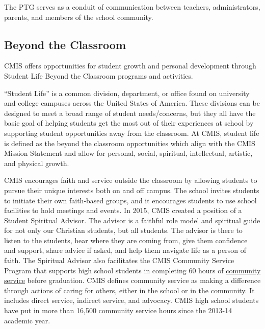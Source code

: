 The PTG serves as a conduit of communication between teachers, administrators, parents, and members of the school community.  


\subsection{Beyond the Classroom}

CMIS offers opportunities for student growth and personal development through Student Life Beyond the Classroom programs and activities.  


“Student Life” is a common division, department, or office found on university and college campuses across the United States of America.  These divisions can be designed to meet a broad range of student needs/concerns, but they all have the basic goal of helping students get the most out of their experiences at school by supporting student opportunities away from the classroom.  At CMIS, student life is defined as the beyond the classroom opportunities which align with the CMIS Mission Statement and allow for personal, social, spiritual, intellectual, artistic, and physical growth.


CMIS encourages faith and service outside the classroom by allowing students to pursue their unique interests both on and off campus. The school invites students to initiate their own faith-based groups, and it encourages students to use school facilities to hold meetings and events.  In 2015, CMIS created a position of  a Student Spiritual Advisor.  The advisor is a faithful role model and spiritual guide for not only our Christian students, but all students. The advisor is there to listen to the students, hear where they are coming from, give them confidence and support, share advice if asked, and help them navigate life as a person of faith. The Spiritual Advisor also facilitates the CMIS Community Service Program that supports high school students in completing 60 hours of \href{http://cmis.ac.th/programs/community_service}{community service} before graduation. CMIS defines community service as making a difference through actions of caring for others, either in the school or in the community.  It includes direct service, indirect service, and advocacy. CMIS high school students have put in more than 16,500 community service hours since the 2013-14 academic year.

